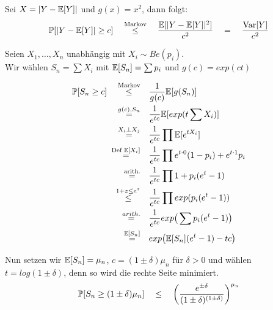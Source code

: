 \begin{definition}[Chebychev]
	Sei \(X=\abs{Y-\E[Y]}\) und \(g(x)=x^2\), dann folgt:
	\[
		\P[\abs{Y-\E[Y]} \geq c]
		\quad \stackrel{\text{Markov}}{\leq} \quad
		\frac{\E[\abs{Y-\E[Y]}^2]}{c^2}
		\quad = \quad
		\frac{\var[Y]}{c^2}
	\]
\end{definition}

\begin{definition}[Chernoff]
	Seien \(X_1,\ldots,X_n\) unabhängig mit \(X_i \sim Be(p_i)\).\\
	Wir wählen \(S_n = \sum X_i\) mit \(\E[S_n]=\sum p_i\) und \(g(c) = exp(ct)\)

	\begin{eqnarray*}
		\begin{split}
			\P[S_n \geq c]									\quad\stackrel{\text{Markov}}{\leq}\quad&
			\frac{1}{g(c)}		\E[g(S_n)]					\\ \quad\stackrel{g(c),S_n}{=}\quad&
			\frac{1}{ e^{tc} } \E[ exp( t \sum X_i ) ]  	\\ \quad\stackrel{X_i \perp X_j}{=}\quad&
			\frac{1}{ e^{tc} } \prod \E[ e^{t X_i} ]		\\ \quad\stackrel{\text{Def }\E[X_i]}{=}\quad&
			\frac{1}{ e^{tc} } \prod  e^{t \cdot 0} (1-p_i) + e^{t \cdot 1} p_i \\ \quad\stackrel{\text{arith.}}{=}\quad&
			\frac{1}{ e^{tc} } \prod  1 + p_i(e^t - 1) 		\\\quad\stackrel{1+z \leq e^z}{\leq}\quad&
			\frac{1}{ e^{tc} } \prod  exp( p_i(e^t - 1) )	\\ \quad\stackrel{arith.}{=}\quad&
			\frac{1}{ e^{tc} }  exp\big( \sum p_i(e^t - 1) \big)	\\ \quad\stackrel{\E[S_n]}{=}\quad&
			exp\big( \E[S_n] (e^t - 1) - tc \big)
		\end{split}
	\end{eqnarray*}

	Nun setzen wir \( \E[S_n] = \mu_n \), \( c = (1 \pm \delta) \mu_n \) für \(\delta > 0\)
	und wählen \( t=log(1 \pm \delta) \), denn so wird die rechte Seite minimiert.
	\[
		\P[S_n \geq (1 \pm \delta)\mu_n] 					\quad \leq \quad
		\bigg( \frac{ e^{ \pm \delta} }{ (1 \pm \delta)^{ (1 \pm \delta) } } \bigg) ^{\mu_n}
	\]

\end{definition}





